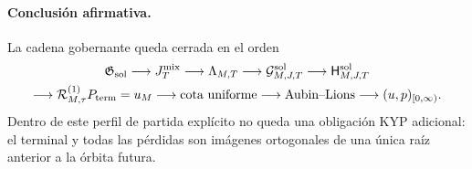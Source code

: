 \paragraph{Conclusión afirmativa.}
La cadena gobernante queda cerrada en el orden
\[
 \begin{gathered}
 \mathfrak G_{\rm sol}
 \longrightarrow J_T^{\rm mix}
 \longrightarrow\Lambda_{M,T}
 \longrightarrow\mathcal G_{M,J,T}^{\rm sol}
 \longrightarrow\mathsf H_{M,J,T}^{\rm sol}\\
 \longrightarrow\mathcal R_{M,\tau}^{(1)}P_{\rm term}=u_M
 \longrightarrow\text{cota uniforme}
 \longrightarrow\text{Aubin--Lions}
 \longrightarrow(u,p)_{[0,\infty)}.
 \end{gathered}
\]
Dentro de este perfil de partida explícito no queda una obligación KYP adicional:
el terminal y todas las pérdidas son imágenes ortogonales de una única raíz
anterior a la órbita futura.
